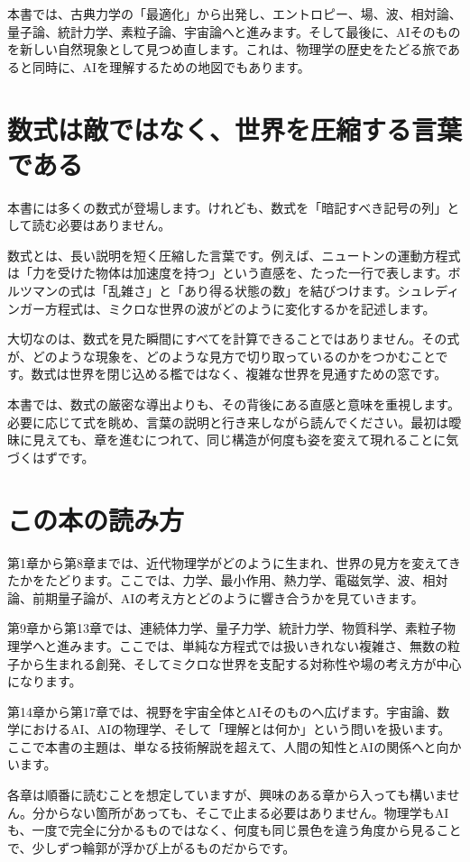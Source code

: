 本書では、古典力学の「最適化」から出発し、エントロピー、場、波、相対論、量子論、統計力学、素粒子論、宇宙論へと進みます。そして最後に、AIそのものを新しい自然現象として見つめ直します。これは、物理学の歴史をたどる旅であると同時に、AIを理解するための地図でもあります。

\section*{数式は敵ではなく、世界を圧縮する言葉である}

本書には多くの数式が登場します。けれども、数式を「暗記すべき記号の列」として読む必要はありません。

数式とは、長い説明を短く圧縮した言葉です。例えば、ニュートンの運動方程式は「力を受けた物体は加速度を持つ」という直感を、たった一行で表します。ボルツマンの式は「乱雑さ」と「あり得る状態の数」を結びつけます。シュレディンガー方程式は、ミクロな世界の波がどのように変化するかを記述します。

大切なのは、数式を見た瞬間にすべてを計算できることではありません。その式が、どのような現象を、どのような見方で切り取っているのかをつかむことです。数式は世界を閉じ込める檻ではなく、複雑な世界を見通すための窓です。

本書では、数式の厳密な導出よりも、その背後にある直感と意味を重視します。必要に応じて式を眺め、言葉の説明と行き来しながら読んでください。最初は曖昧に見えても、章を進むにつれて、同じ構造が何度も姿を変えて現れることに気づくはずです。

\section*{この本の読み方}

第1章から第8章までは、近代物理学がどのように生まれ、世界の見方を変えてきたかをたどります。ここでは、力学、最小作用、熱力学、電磁気学、波、相対論、前期量子論が、AIの考え方とどのように響き合うかを見ていきます。

第9章から第13章では、連続体力学、量子力学、統計力学、物質科学、素粒子物理学へと進みます。ここでは、単純な方程式では扱いきれない複雑さ、無数の粒子から生まれる創発、そしてミクロな世界を支配する対称性や場の考え方が中心になります。

第14章から第17章では、視野を宇宙全体とAIそのものへ広げます。宇宙論、数学におけるAI、AIの物理学、そして「理解とは何か」という問いを扱います。ここで本書の主題は、単なる技術解説を超えて、人間の知性とAIの関係へと向かいます。

各章は順番に読むことを想定していますが、興味のある章から入っても構いません。分からない箇所があっても、そこで止まる必要はありません。物理学もAIも、一度で完全に分かるものではなく、何度も同じ景色を違う角度から見ることで、少しずつ輪郭が浮かび上がるものだからです。

